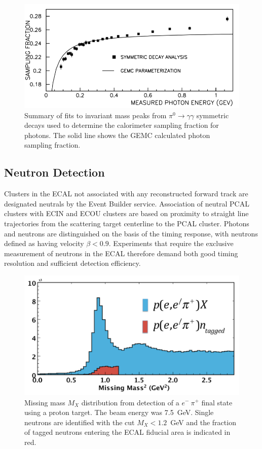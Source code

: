 \begin{figure}[h]
\centering
\includegraphics[width=1.0\columnwidth,keepaspectratio]{img/fx-study-summary-2.png}
\caption[]{Summary of fits to invariant mass peaks from $\pi^0 \rightarrow \gamma \gamma$ symmetric decays
  used to determine the calorimeter sampling fraction for photons. The solid line shows the GEMC calculated
  photon sampling fraction.}
\label{fig:fx-study-summary-2}
\end{figure}

\subsection{Neutron Detection}

Clusters in the ECAL not associated with any reconstructed forward track are designated neutrals by the Event
Builder service. Association of neutral PCAL clusters with ECIN and ECOU clusters are based on proximity to
straight line trajectories from the scattering target centerline to the PCAL cluster. Photons and neutrons are
distinguished on the basis of the timing response, with neutrons defined as having velocity $\beta < 0.9$.
Experiments that require the exclusive measurement of neutrons in the ECAL therefore demand both good timing
resolution and sufficient detection efficiency. 

\begin{figure}[h]
\centering
\includegraphics[width=1.0\columnwidth,keepaspectratio]{img/S10_4_0.png}
\caption[]{Missing mass $M_X$ distribution from detection of a $e^-~\pi^+$ final state using a proton target. The
  beam energy was 7.5~GeV. Single neutrons are identified with the cut $M_X < 1.2$~GeV and the fraction of tagged
  neutrons entering the ECAL fiducial area is indicated in red.}
\label{fig:S10_4_0}
\end{figure}

